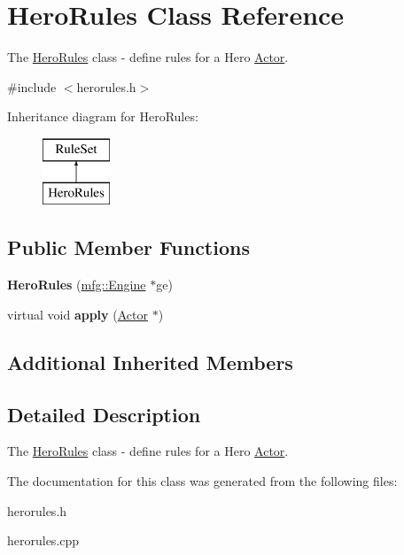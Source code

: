 \hypertarget{class_hero_rules}{}\section{Hero\+Rules Class Reference}
\label{class_hero_rules}


The \hyperlink{class_hero_rules}{Hero\+Rules} class -\/ define rules for a Hero \hyperlink{class_actor}{Actor}.  




{\ttfamily \#include $<$herorules.\+h$>$}

Inheritance diagram for Hero\+Rules\+:\begin{figure}[H]
\begin{center}
\leavevmode
\includegraphics[height=2.000000cm]{class_hero_rules}
\end{center}
\end{figure}
\subsection*{Public Member Functions}
\begin{DoxyCompactItemize}
\item 
\mbox{\label{class_hero_rules_a93fc8af4e87266175944bc917e5f3c42}} 
{\bfseries Hero\+Rules} (\hyperlink{classmfg_1_1_engine}{mfg\+::\+Engine} $\ast$ge)
\item 
\mbox{\label{class_hero_rules_a5e9001ef72079bf30525398c95acbd6e}} 
virtual void {\bfseries apply} (\hyperlink{class_actor}{Actor} $\ast$)
\end{DoxyCompactItemize}
\subsection*{Additional Inherited Members}


\subsection{Detailed Description}
The \hyperlink{class_hero_rules}{Hero\+Rules} class -\/ define rules for a Hero \hyperlink{class_actor}{Actor}. 

The documentation for this class was generated from the following files\+:\begin{DoxyCompactItemize}
\item 
herorules.\+h\item 
herorules.\+cpp\end{DoxyCompactItemize}
